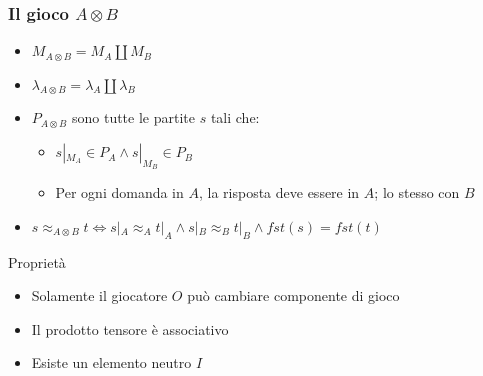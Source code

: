 \documentclass{beamer}
\begin{document}
\begin{frame}

% 	
% 	

% 	 
% 	 

\end{frame}

\begin{frame}
	
	\frametitle{Il gioco $A \otimes B$}
	
	\begin{itemize}
		\item $M_{A\otimes B}=M_A \coprod M_B$
		\item $\lambda_{A\otimes B}=\lambda_A \coprod \lambda_B$
		\item $P_{A\otimes B}$ sono tutte le partite $s$ tali che:
		\begin{itemize}
			\item $s|_{M_A} \in P_A \wedge s|_{M_B} \in P_B$
			\item Per ogni domanda in $A$, la risposta deve essere in $A$; lo stesso con $B$
		\end{itemize}
		\item $s\approx_{A\otimes B} t \Leftrightarrow s|_A \approx_A t|_A \wedge s|_B \approx_B t|_B \wedge fst(s)=fst(t)$ 
	\end{itemize}
	
	\begin{block}{Proprietà}
		\begin{itemize}
			\item Solamente il giocatore $O$ può cambiare componente di gioco
			\item Il prodotto tensore è associativo
			\item Esiste un elemento neutro $I$
		\end{itemize}
		
	\end{block}
	
	
\end{frame}
\end{document}
